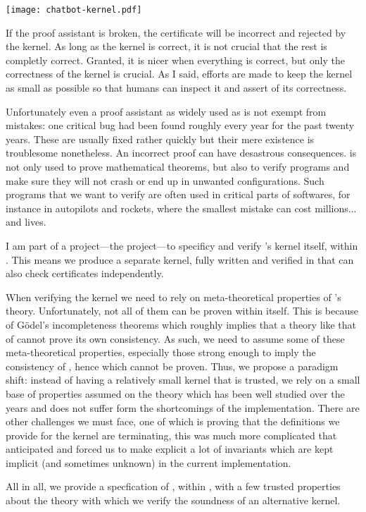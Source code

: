 \begin{center}
  \texttt{[image: chatbot-kernel.pdf]}
\end{center}

If the proof assistant is broken, the certificate will be incorrect and rejected
by the kernel. As long as the kernel is correct, it is not crucial that the rest
is completly correct. Granted, it is nicer when everything is correct, but only
the correctness of the kernel is crucial.
As I said, efforts are made to keep the kernel as small as possible so that
humans can inspect it and assert of its correctness.

Unfortunately even a proof assistant as widely used as \Coq is not exempt from
mistakes: one critical bug had been found roughly every year for the past twenty
years. These are usually fixed rather quickly but their mere existence is
troublesome nonetheless.
An incorrect proof can have desastrous consequences. \Coq is not only used to
prove mathematical theorems, but also to verify programs and make sure they will
not crash or end up in unwanted configurations. Such programs that we want to
verify are often used in critical parts of softwares, for instance in autopilots
and rockets, where the smallest mistake can cost millions... and lives.

I am part of a project---the \MetaCoq project---to specificy and verify \Coq's
kernel itself, within \Coq. This means we produce a separate kernel, fully
written and verified in \Coq that can also check certificates independently.

When verifying the kernel we need to rely on meta-theoretical properties of
\Coq's theory. Unfortunately, not all of them can be proven within \Coq itself.
%
This is because of Gödel's incompleteness theorems which roughly implies that a
theory like that of \Coq cannot prove its own consistency. As such, we need to
assume some of these meta-theoretical properties, especially those strong enough
to imply the consistency of \Coq, hence which cannot be proven.
Thus, we propose a paradigm shift: instead of having a relatively small kernel
that is trusted, we rely on a small base of properties assumed on the theory
which has been well studied over the years and does not suffer form the
shortcomings of the implementation.
There are other challenges we must face, one of which is proving that the
definitions we provide for the kernel are terminating, this was much more
complicated that anticipated and forced us to make explicit a lot of invariants
which are kept implicit (and sometimes unknown) in the current implementation.

All in all, we provide a specfication of \Coq, within \Coq, with a few trusted
properties about the theory with which we verify the soundness of an alternative
\Coq kernel.

